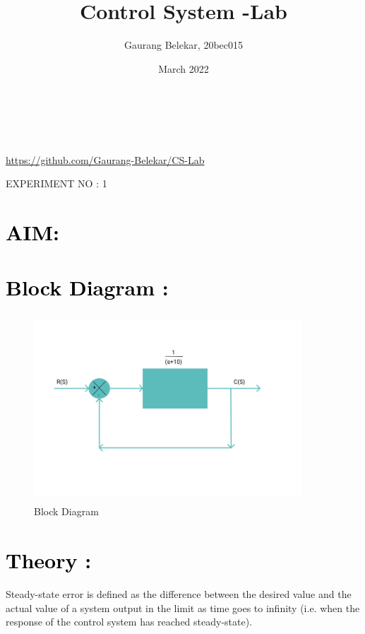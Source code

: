 \documentclass[12pt]{article}
\title{Control System -Lab}
\author{Gaurang Belekar, 20bec015}
\date{March 2022}
\begin{document}
\maketitle
\begin{center}
\\
\\


\url{https://github.com/Gaurang-Belekar/CS-Lab}
\end{center}
\pagebreak

\begin{center}
    \LARGE {EXPERIMENT NO : 1}
             
\end{center}

\section*{\textcolor{black}{AIM: }}

\section*{\textcolor{black}{Block Diagram :}}
\begin{figure}[!hth]
        \centering
        \includegraphics[width =10cm, height = 7cm]{images/exp1.png}
        \caption{Block Diagram}
        \label{Graph}
\end{figure}

\newline

\section*{\textcolor{black}{Theory :}}
Steady-state error is defined as the difference between the desired value and the actual value of a system output in the limit as time goes to infinity (i.e. when the response of the control system has reached steady-state).\par
\end{document}
